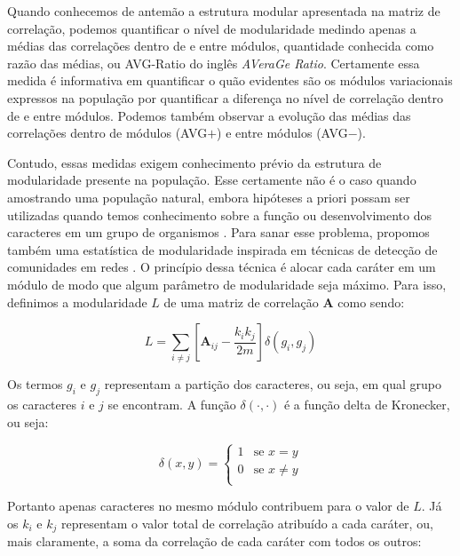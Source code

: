 Quando conhecemos de antemão a estrutura modular apresentada na matriz
de correlação, podemos quantificar o nível de modularidade medindo
apenas a médias das correlações dentro de e entre módulos, quantidade
conhecida como razão das médias, ou AVG-Ratio do inglês {\it AVeraGe Ratio}.
Certamente essa medida é informativa em quantificar o quão evidentes são
os módulos variacionais expressos na população por quantificar a
diferença no nível de correlação dentro de e entre módulos.
Podemos também observar a evolução das médias das correlações dentro
de módulos (AVG$+$) e entre módulos (AVG$-$).

Contudo, essas medidas exigem conhecimento prévio da estrutura de
modularidade presente na população.
Esse certamente não é o caso quando amostrando uma população natural,
embora hipóteses a priori possam ser utilizadas quando temos conhecimento
sobre a função ou desenvolvimento dos caracteres em um grupo de
organismos \citep{Cheverud1985a, Marroig2001}.
Para sanar esse problema, propomos também uma estatística de
modularidade inspirada em técnicas de detecção de comunidades em redes
\citep{Newman2006,Newman2006a,Reichardt2006}.
O princípio dessa técnica é alocar cada caráter em um módulo de modo que
algum parâmetro de modularidade seja máximo.
Para isso, definimos a modularidade $L$ de uma matriz de correlação
$\mathbf{A}$
como sendo:

\begin{equation}
    L = \sum_{i \neq j} \left[ \mathbf{A}_{ij} - \frac{k_ik_j}{2m} \right] \delta(g_i, g_j)
\end{equation}

Os termos $g_i$ e $g_j$ representam a partição dos caracteres, ou seja, em
qual grupo os caracteres $i$ e $j$ se encontram.
A função $\delta(\cdot,\cdot)$ é a função delta de Kronecker, ou seja:

\begin{equation}
   \delta (x,y) = \left \{ 
      \begin{array}{rl}
          1 & \text{se } x = y\\
          0 & \text{se } x \neq y\\
      \end{array} \right.
\end{equation}

Portanto apenas caracteres no mesmo módulo contribuem para o valor de $L$.
Já os $k_i$ e $k_j$  representam o valor total de correlação atribuído a
cada caráter, ou, mais claramente, a soma da correlação de cada caráter com
todos os outros:

